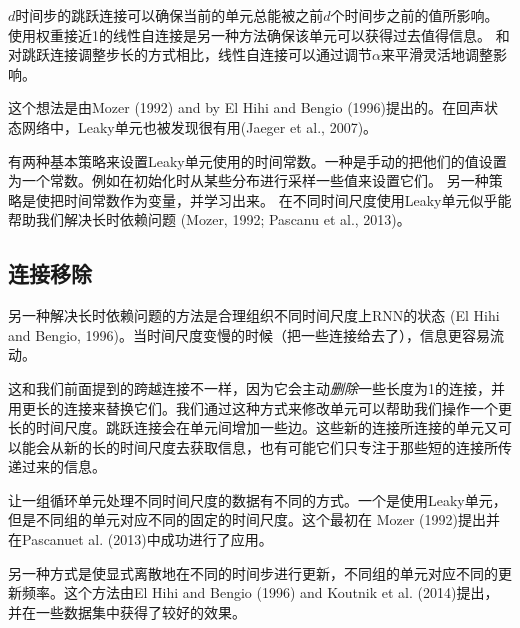 $d$时间步的跳跃连接可以确保当前的单元总能被之前$d$个时间步之前的值所影响。
使用权重接近1的线性自连接是另一种方法确保该单元可以获得过去值得信息。
和对跳跃连接调整步长的方式相比，线性自连接可以通过调节$\alpha$来平滑灵活地调整影响。

这个想法是由Mozer (1992) and by El Hihi and Bengio (1996)提出的。在回声状态网络中，Leaky单元也被发现很有用(Jaeger et al., 2007)。

有两种基本策略来设置Leaky单元使用的时间常数。一种是手动的把他们的值设置为一个常数。例如在初始化时从某些分布进行采样一些值来设置它们。
另一种策略是使把时间常数作为变量，并学习出来。
在不同时间尺度使用Leaky单元似乎能帮助我们解决长时依赖问题 (Mozer, 1992; Pascanu et al., 2013)。


\subsection{连接移除}
\label{sec:10.9.3}
另一种解决长时依赖问题的方法是合理组织不同时间尺度上RNN的状态 (El Hihi and Bengio, 1996)。当时间尺度变慢的时候（把一些连接给去了），信息更容易流动。

这和我们前面提到的跨越连接不一样，因为它会主动\emph{删除}一些长度为1的连接，并用更长的连接来替换它们。我们通过这种方式来修改单元可以帮助我们操作一个更长的时间尺度。跳跃连接会在单元间增加一些边。这些新的连接所连接的单元又可以能会从新的长的时间尺度去获取信息，也有可能它们只专注于那些短的连接所传递过来的信息。

让一组循环单元处理不同时间尺度的数据有不同的方式。一个是使用Leaky单元，但是不同组的单元对应不同的固定的时间尺度。这个最初在 Mozer (1992)提出并在Pascanuet al. (2013)中成功进行了应用。

另一种方式是使显式离散地在不同的时间步进行更新，不同组的单元对应不同的更新频率。这个方法由El Hihi and Bengio (1996) and Koutnik et al. (2014)提出，并在一些数据集中获得了较好的效果。



